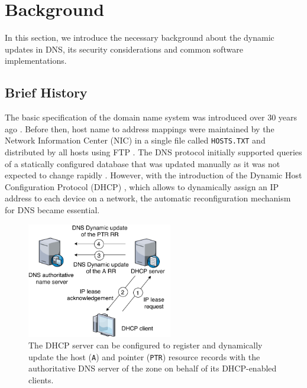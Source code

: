 \section{Background}


In this section, we introduce the necessary background about the dynamic updates in DNS, its security considerations and common software implementations.

\subsection{Brief History}
The basic specification of the domain name system was introduced over 30 years ago \cite{rfc1035,rfc1034}. 
Before then, host name to address mappings were maintained by the Network Information Center (NIC) in a single file called \texttt{HOSTS.TXT} and distributed by all hosts using FTP \cite{rfc952,rfc953}.
%
The DNS protocol initially supported queries of a statically configured database that was updated manually as it was not expected to change rapidly \cite{rfc1034}. 
However, with the introduction of the Dynamic Host Configuration Protocol (DHCP) \cite{rfc2131}, which allows to dynamically assign an IP address to each device on a network, the automatic reconfiguration mechanism for DNS  became essential.

\begin{figure}[!ht]
\centering
\includegraphics[width=2.5in]{figs/dhcp.pdf}
\caption{The DHCP server can be configured to register and dynamically update the host (\texttt{A}) and pointer (\texttt{PTR}) resource records with the authoritative DNS server of the zone on behalf of its DHCP-enabled clients.
}
\label{fig_dhcp}
\end{figure}

